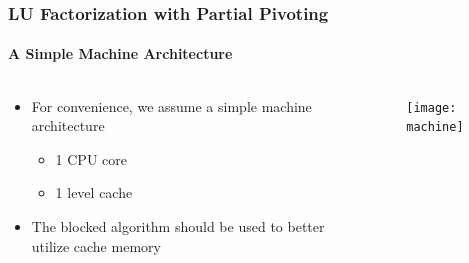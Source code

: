 \documentclass[aspectratio=169]{beamer}
\begin{document}
\begin{frame}
  \frametitle{LU Factorization with Partial Pivoting}
  \framesubtitle{A Simple Machine Architecture}
  \begin{columns}
    \begin{column}{.6\textwidth}
      \begin{itemize}
      \item For convenience, we assume a simple machine architecture
        \begin{itemize}
        \item 1 CPU core
        \item 1 level cache
        \end{itemize}
      \item The blocked algorithm should be used to better utilize cache memory
      \end{itemize}
    \end{column}
    \begin{column}{.4\textwidth}
      \begin{figure}
        \centering
        \texttt{[image: machine]}
      \end{figure}
    \end{column}
  \end{columns}
\end{frame}
\end{document}
